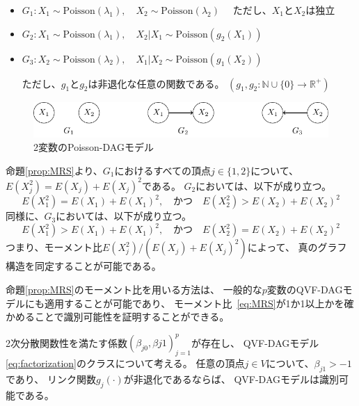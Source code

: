 \begin{itemize}
  \item $G_1 \colon X_1 \sim \mathrm{Poisson}(\lambda_1),
         \quad X_2 \sim \mathrm{Poisson}(\lambda_2) \quad$ ただし、$X_1$と$X_2$は独立

  \item $G_2 \colon X_1 \sim \mathrm{Poisson}(\lambda_1),
         \quad X_2|X_1 \sim \mathrm{Poisson}(g_2(X_1))$

  \item $G_3 \colon X_2 \sim \mathrm{Poisson}(\lambda_2),
         \quad X_1|X_2 \sim \mathrm{Poisson}(g_1(X_2))$

  ただし、$g_1$と$g_2$は非退化な任意の関数である。
  $(g_1, g_2 \colon \mathbb{N} \cup \{ 0 \} \rightarrow \mathbb{R}^+)$
\end{itemize}

\begin{figure}[h]
  \centering
  \includegraphics{./picture/bivariate.pdf}
  \caption{2変数のPoisson-DAGモデル}
  \label{fig:ex_bivariate}
\end{figure}

命題\ref{prop:MRS}より、$G_1$におけるすべての頂点$j \in \{ 1,2 \}$について、
$E(X_j^2) = E(X_j) + E(X_j)^2$である。
$G_2$においては、以下が成り立つ。
\begin{equation*}
  E(X_1^2) = E(X_1) + E(X_1)^2, \quad \text{かつ} \quad
  E(X_2^2) > E(X_2) + E(X_2)^2
\end{equation*}
同様に、$G_3$においては、以下が成り立つ。
\begin{equation*}
  E(X_1^2) > E(X_1) + E(X_1)^2, \quad \text{かつ} \quad
  E(X_2^2) = E(X_2) + E(X_2)^2
\end{equation*}
つまり、モーメント比$E(X_j^2) / (E(X_j) + E(X_j)^2)$によって、
真のグラフ構造を同定することが可能である。

命題\ref{prop:MRS}のモーメント比を用いる方法は、
一般的な$p$変数のQVF-DAGモデルにも適用することが可能であり、
モーメント比~\eqref{eq:MRS}が1か1以上かを確かめることで識別可能性を証明することができる。

\begin{theo}
  2次分散関数性を満たす係数$(\beta_{j0}, \beta{j1})_{j=1}^p$が存在し、
  QVF-DAGモデル\eqref{eq:factorization}のクラスについて考える。
  任意の頂点$j \in V$について、$\beta_{j1} > -1$であり、
  リンク関数$g_j(\cdot)$が非退化であるならば、
  QVF-DAGモデルは識別可能である。
\end{theo}

